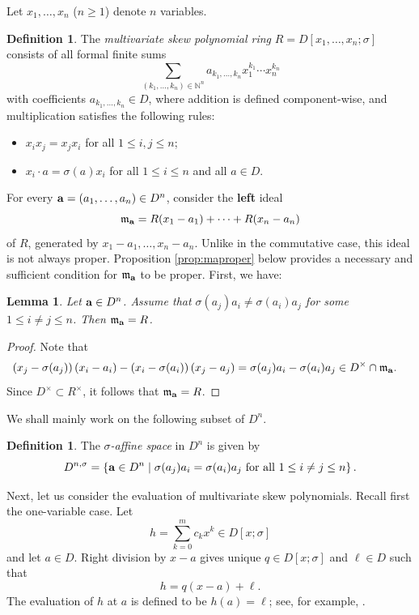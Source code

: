 \documentclass[11pt,reqno]{amsart}
\newtheorem{lem}[thm]{Lemma}
\theoremstyle{definition}
\newtheorem{defn}[thm]{Definition}
\begin{document}
Let $x_1,\dots,x_n$ ($n\geq 1$) denote $n$ variables. 
\begin{defn}\label{def:multi} The \emph{multivariate skew polynomial ring} $R=D[x_1,\ldots,x_n ; \sigma]$ consists of all formal finite sums 
$$\sum_{(k_1,\dots,k_n) \in \mathbb{N}^n}a_{k_1,\dots,k_n} x_1^{k_1}\cdots x_n^{k_n}$$ with coefficients $a_{k_1,\dots,k_n} \in D$, where addition is defined component-wise, and multiplication satisfies the following rules:
\begin{itemize}
\item $x_ix_j=x_jx_i$ for all $1\leq i,j \leq n$;
\item $x_i\cdot a=\sigma(a)x_i$ for all $1\leq i \leq n$ and all $a \in D$. 
\end{itemize}
\end{defn}
For every ${\bf a}=(a_1,\dots,a_n) \in D^n$, consider the {\bf left} ideal
$$\mathfrak{m}_{{\bf a}}=R(x_1-a_1)+\dots+R(x_n-a_n)
$$
of $R$, generated by $x_1-a_1,\dots,x_n-a_n$. Unlike in the commutative case, this ideal is not always proper. Proposition \ref{prop:maproper} below provides a necessary and sufficient condition for $\mathfrak{m}_{{\bf a}}$ to be proper. First, we have:

\begin{lem}\label{lem:condformanontri}
Let ${\bf a} \in D^n$. Assume that $\sigma(a_j)a_i \neq \sigma(a_i)a_j$ for some $1 \leq i \neq j \leq n$. Then $\mathfrak{m}_{{\bf a}}=R$.
\end{lem}
\begin{proof}
Note that
\begin{align*}
\left(x_j-\sigma(a_j) \right)\left(x_i-a_i\right)-\left(x_i-\sigma(a_i)\right)\left(x_j-a_j\right)
&=\sigma(a_j) a_i-\sigma(a_i) a_j \in D^\times \cap \mathfrak{m}_{{\bf a}}.
\end{align*}
Since $D^\times \subset R^\times$, it follows that $\mathfrak{m}_{{\bf a}}=R$.
\end{proof}

We shall mainly work on the following subset of $D^n$.

\begin{defn}\label{def:affine}
The \emph{$\sigma$-affine space} in $D^n$ is given by
$$
D^{n,\sigma}=\left\lbrace {\bf a} \in D^n \mid \sigma(a_j) a_i = \sigma(a_i) a_j\,\, \textrm{for all}\,\,1\leq i\neq j \leq n\right\rbrace.
$$ 
\end{defn}

Next, let us consider the evaluation of multivariate skew polynomials. Recall first the one-variable case. Let
\[
h=\sum_{k=0}^m c_kx^k\in D[x;\sigma]
\]
and let $a\in D$. Right division by $x-a$ gives unique $q\in D[x;\sigma]$ and $\ell\in D$ such that
\[
h=q(x-a)+\ell.
\]
The evaluation of $h$ at $a$ is defined to be $h(a)=\ell$; see, for example, \cite[\S2]{Lam86}.
\end{document}
